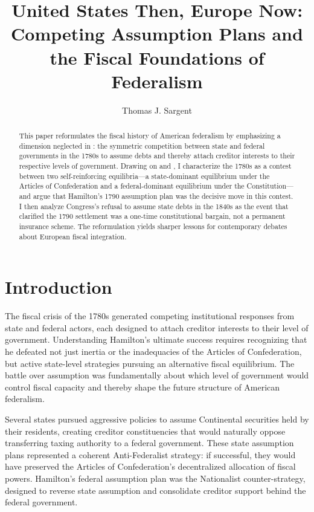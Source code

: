 \documentclass[12pt]{article}
\title{United States Then, Europe Now:\\
\large Competing Assumption Plans and the Fiscal Foundations of Federalism}
\author{Thomas J. Sargent}
\date{}
\begin{document}
\maketitle

\begin{abstract}
This paper reformulates the fiscal history of American federalism by
emphasizing a dimension neglected in \citet{Sargent2012}: the symmetric
competition between state and federal governments in the 1780s to assume
debts and thereby attach creditor interests to their respective levels of
government. Drawing on \citet{Ferguson1961} and \citet{Rothbard2019}, I
characterize the 1780s as a contest between two self-reinforcing
equilibria---a state-dominant equilibrium under the Articles of
Confederation and a federal-dominant equilibrium under the
Constitution---and argue that Hamilton's 1790 assumption plan was the
decisive move in this contest. I then analyze Congress's refusal to
assume state debts in the 1840s as the event that clarified the 1790
settlement was a one-time constitutional bargain, not a permanent
insurance scheme. The reformulation yields sharper lessons for
contemporary debates about European fiscal integration.
\end{abstract}


\section{Introduction}

The fiscal crisis of the 1780s generated competing institutional
responses from state and federal actors, each designed to attach creditor
interests to their level of government. Understanding Hamilton's
ultimate success requires recognizing that he defeated not just inertia
or the inadequacies of the Articles of Confederation, but active
state-level strategies pursuing an alternative fiscal equilibrium. The
battle over assumption was fundamentally about which level of government
would control fiscal capacity and thereby shape the future structure of
American federalism.

Several states pursued aggressive policies to assume Continental
securities held by their residents, creating creditor constituencies
that would naturally oppose transferring taxing authority to a federal
government. These state assumption plans represented a coherent
Anti-Federalist strategy: if successful, they would have preserved the
Articles of Confederation's decentralized allocation of fiscal powers.
Hamilton's federal assumption plan was the Nationalist counter-strategy,
designed to reverse state assumption and consolidate creditor support
behind the federal government.
\end{document}
